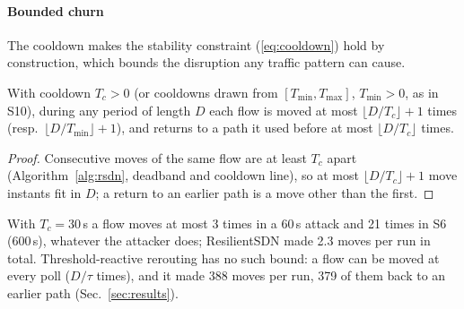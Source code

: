 \paragraph{Bounded churn}
The cooldown makes the stability constraint (\ref{eq:cooldown}) hold by construction, which bounds the
disruption any traffic pattern can cause.
\begin{proposition}\label{prop:churn}
With cooldown $T_c>0$ (or cooldowns drawn from $[T_{\min},T_{\max}]$, $T_{\min}>0$, as in S10), during
any period of length $D$ each flow is moved at most $\lfloor D/T_c\rfloor+1$ times (resp.\
$\lfloor D/T_{\min}\rfloor+1$), and returns to a path it used before at most $\lfloor D/T_c\rfloor$ times.
\end{proposition}
\begin{proof}
Consecutive moves of the same flow are at least $T_c$ apart (Algorithm~\ref{alg:rsdn}, deadband and
cooldown line), so at most $\lfloor D/T_c\rfloor+1$ move instants fit in $D$; a return to an earlier path
is a move other than the first.
\end{proof}
With $T_c=30$\,s a flow moves at most 3 times in a 60\,s attack and 21 times in S6 (600\,s), whatever the
attacker does; ResilientSDN made 2.3 moves per run in total. Threshold-reactive rerouting has no such
bound: a flow can be moved at every poll ($D/\tau$ times), and it made 388 moves per run, 379 of them
back to an earlier path (Sec.~\ref{sec:results}).


